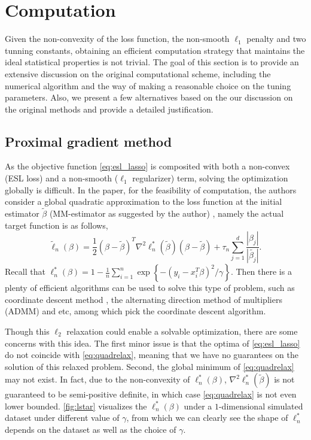 \section{Computation}\label{sec:computation} Given the non-convexity of the
loss function, the non-smooth $\ell_1$
penalty and two tunning constants, obtaining an efficient computation strategy that maintains the ideal statistical
properties is not trivial. The goal of this section is to provide an extensive discussion on the original
computational scheme, including the numerical algorithm and the way of making a reasonable choice on the tuning
parameters. Also, we present a few alternatives based on the our discussion on the original methods and provide a
detailed justification.


\subsection{Proximal gradient method} 

As the objective function \cref{eq:esl_lasso} is composited with both a
non-convex (ESL loss) and a non-smooth ($\ell_1$ regularizer) term, solving the optimization globally is difficult.
In the paper, for the feasibility of computation, the authors consider a global quadratic approximation to the loss
function at the initial estimator $\tilde{\beta}$ (MM-estimator as suggested by the author) , namely the actual
target function is as follows, 
\[\label{eq:quadrelax} \tilde{\ell}_n(\beta) = \frac{1}{2} (\beta - \tilde{\beta})^T
\nabla^2 \ell_n^*(\tilde{\beta}) (\beta - \tilde{\beta}) + \tau_n \sum_{j = 1}^d \frac{|\beta_j|}{|\tilde{\beta_j}|}. \] 
Recall that $\ell^*_n(\beta) = 1 -\frac{1}{n}\sum_{i = 1}^ n \exp \left\{ -(y_i-
x_i^T\beta)^2/\gamma\right\}$. Then there is a plenty of efficient algorithms can be used to solve this type of
problem, such as coordinate descent method \citep{wu2008coordinate}, the alternating direction method of multipliers
(ADMM) \citep{ouyang2013stochastic} and etc, among which \citep{wang2013robust} pick the coordinate descent
algorithm.

Though this $\ell_2$ relaxation could enable a solvable optimization, there are some concerns with this idea. The
first minor issue is that the optima of \cref{eq:esl_lasso} do not coincide with \cref{eq:quadrelax}, meaning that we
have no guarantees on the solution of this relaxed problem. Second, the global minimum of \cref{eq:quadrelax} may not
exist. In fact, due to the non-convexity of $\ell_n^*(\beta)$, $\nabla^2 \ell_n^*(\tilde \beta)$ is not guaranteed to
be semi-positive definite, in which case \cref{eq:quadrelax} is not even lower bounded. \cref{fig:lstar} visualizes
the $\ell_n^*(\beta)$ under a $1$-dimensional simulated dataset under different value of $\gamma$, from which we can
clearly see the shape of $\ell_n^*$ depends on the dataset as well as the choice of $\gamma$.



